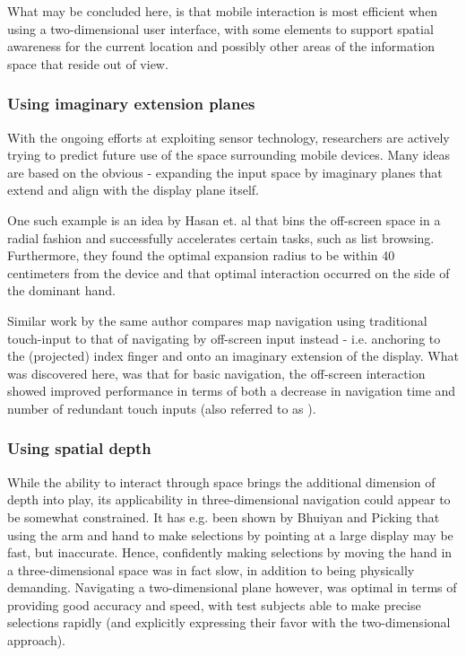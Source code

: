 What may be concluded here, is that mobile interaction is most efficient when using a two-dimensional user interface, with some elements to support spatial awareness for the current location and possibly other areas of the information space that reside out of view. 


\subsubsection{Using imaginary extension planes}

With the ongoing efforts at exploiting sensor technology, researchers are actively trying to predict future use of the space  surrounding mobile devices. Many ideas are based on the obvious - expanding the input space by imaginary planes that extend and align with the display plane itself. 

One such example is an idea by Hasan et. al\cite{adbin} that bins the off-screen space in a radial fashion and successfully accelerates certain tasks, such as list browsing. Furthermore, they found the optimal expansion radius to be within 40 centimeters from the device and that optimal interaction occurred on the side of the dominant hand. 

Similar work by the same author\cite{Hasan} compares map navigation using traditional  touch-input to that of navigating by off-screen input instead - i.e. anchoring to the (projected) index finger and onto an imaginary extension of the display. What was discovered here, was that for basic navigation, the off-screen interaction showed improved performance in terms of both a decrease in navigation time and number of redundant touch inputs (also referred to as ).

 
\subsubsection{Using spatial depth}


While the ability to interact through space brings the additional dimension of depth into play, its applicability in three-dimensional navigation could appear to  be somewhat constrained. It has  e.g. been shown by Bhuiyan and Picking\cite{AirPointing} that using the arm and hand to make selections by pointing at a large display may be fast, but inaccurate. Hence, confidently making selections by moving the hand in a three-dimensional space was in fact slow, in addition to being physically demanding. Navigating a two-dimensional plane however, was optimal in terms of providing good accuracy and speed, with test subjects able to make precise selections rapidly (and explicitly expressing their favor with the two-dimensional approach). 

